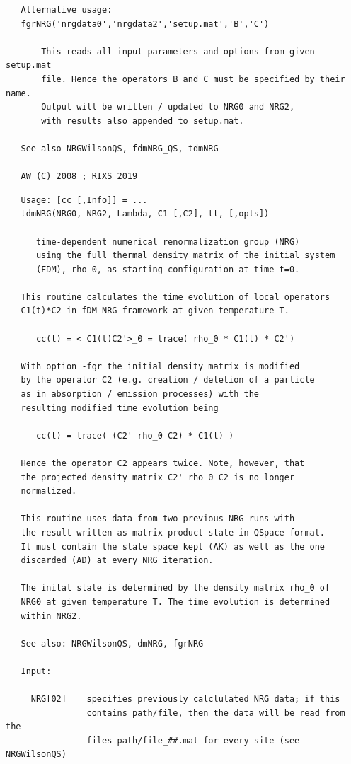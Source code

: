 \documentclass[twoside,12pt]{article}
\begin{document}
\begin{verbatim}
   Alternative usage:
   fgrNRG('nrgdata0','nrgdata2','setup.mat','B','C')
 
       This reads all input parameters and options from given setup.mat
       file. Hence the operators B and C must be specified by their name.
       Output will be written / updated to NRG0 and NRG2,
       with results also appended to setup.mat.
 
   See also NRGWilsonQS, fdmNRG_QS, tdmNRG
 
   AW (C) 2008 ; RIXS 2019
\end{verbatim}

\pagebreak[3]



\begin{verbatim}
   Usage: [cc [,Info]] = ...
   tdmNRG(NRG0, NRG2, Lambda, C1 [,C2], tt, [,opts])
 
      time-dependent numerical renormalization group (NRG)
      using the full thermal density matrix of the initial system
      (FDM), rho_0, as starting configuration at time t=0.
 
   This routine calculates the time evolution of local operators
   C1(t)*C2 in fDM-NRG framework at given temperature T.
 
      cc(t) = < C1(t)C2'>_0 = trace( rho_0 * C1(t) * C2')
 
   With option -fgr the initial density matrix is modified
   by the operator C2 (e.g. creation / deletion of a particle
   as in absorption / emission processes) with the
   resulting modified time evolution being
 
      cc(t) = trace( (C2' rho_0 C2) * C1(t) )
 
   Hence the operator C2 appears twice. Note, however, that
   the projected density matrix C2' rho_0 C2 is no longer
   normalized.
 
   This routine uses data from two previous NRG runs with
   the result written as matrix product state in QSpace format.
   It must contain the state space kept (AK) as well as the one
   discarded (AD) at every NRG iteration.
 
   The inital state is determined by the density matrix rho_0 of
   NRG0 at given temperature T. The time evolution is determined
   within NRG2.
 
   See also: NRGWilsonQS, dmNRG, fgrNRG
 
   Input:
 
     NRG[02]    specifies previously calclulated NRG data; if this
                contains path/file, then the data will be read from the
                files path/file_##.mat for every site (see NRGWilsonQS)
 

\end{verbatim}
\end{document}

